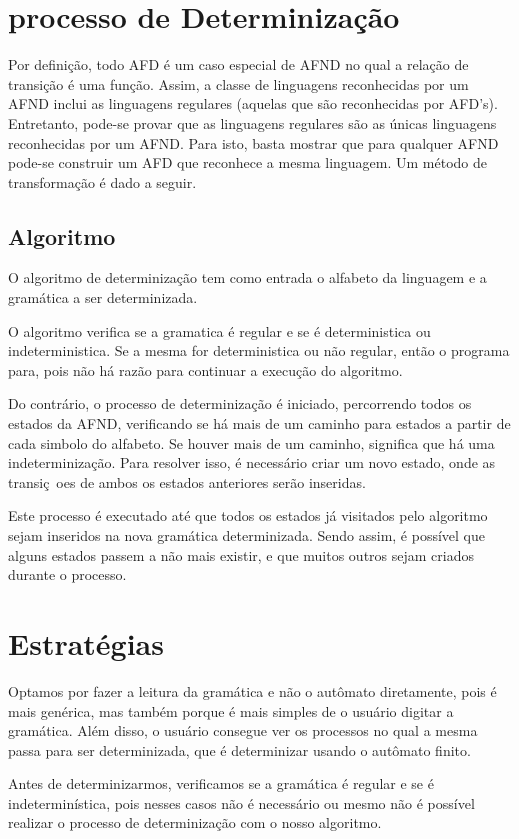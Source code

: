 \documentclass[10pt,a4paper,titlepage]{hitec}
\begin{document}
\section*{processo de Determinização}

Por definição, todo AFD é um caso especial de AFND no qual a relação de transição é uma função.
Assim, a classe de linguagens reconhecidas por um AFND inclui as linguagens regulares (aquelas que são reconhecidas por AFD's).
Entretanto, pode-se provar que as linguagens regulares são as únicas linguagens reconhecidas por um AFND. 
Para isto, basta mostrar que para qualquer AFND pode-se construir um AFD que reconhece a mesma linguagem. 
Um método de transformação é dado a seguir.

\subsection*{Algoritmo}

O algoritmo de determinização tem como entrada o alfabeto da linguagem e a gramática a ser determinizada.

O algoritmo verifica se a gramatica é regular e se é deterministica ou indeterministica. Se a mesma for deterministica ou não regular, então o programa para, pois não há razão para continuar  a execução do algoritmo.

Do contrário, o processo de determinização é iniciado, percorrendo todos os estados da AFND, verificando se há mais de um caminho para estados a partir de cada simbolo do alfabeto. Se houver mais de um caminho, significa que há uma indeterminização. Para resolver isso, é necessário criar um novo estado, onde as transiç~oes de ambos os estados anteriores serão inseridas.

Este processo é executado até que todos os estados já visitados pelo algoritmo sejam inseridos na nova gramática determinizada. Sendo assim, é possível que alguns estados passem a não mais existir, e que muitos outros sejam criados durante o processo.

\section*{Estratégias}

Optamos por fazer a leitura da gramática e não o autômato diretamente, pois é mais genérica, mas também porque é mais simples de o usuário digitar a gramática. Além disso, o usuário consegue ver os processos no qual a mesma passa para ser determinizada, que é determinizar usando o autômato finito.	

Antes de determinizarmos, verificamos se a gramática é regular e se é indeterminística, pois nesses casos não é necessário ou mesmo não é possível realizar o processo de determinização com o nosso algoritmo.
\end{document}
